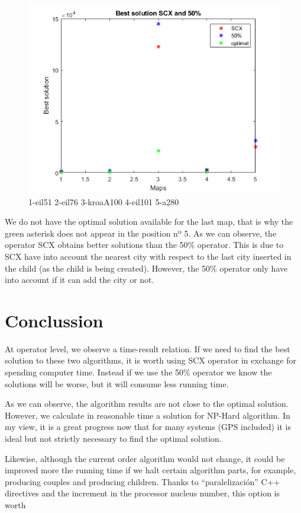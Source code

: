 \documentclass{article}
\begin{document}
\begin{figure}[H]
    \centering
    \includegraphics[width=1\textwidth]{solutions.png}
    \caption{1-eil51 2-eil76 3-kroaA100 4-eil101 5-a280}
\end{figure}
We do not have the optimal solution available for the last map, that is why the green asterisk does not appear in the position nº 5. 
As we can observe, the operator SCX obtains better solutions than the 50\% operator. This is due to SCX have into account the 
nearest city with respect to the last city inserted in the child (as the child is being created). However, the 50\% operator only have 
into account if it can add the city or not.

\section{Conclussion}
At operator level, we observe a time-result relation. If we need to find the best solution to these two algorithms, it is worth using SCX 
operator in exchange for spending computer time. Instead if we use the 50\% operator we know the solutions will be worse, but it will consume 
less running time. 

As we can observe, the algorithm results are not close to the optimal solution. However, we calculate in reasonable time a solution for NP-Hard 
algorithm. In my view, it is a great progress now that for many systems (GPS included) it is ideal but not strictly necessary to find the 
optimal solution.


Likewise, although the current order algorithm would not change, it could be improved more the running time if we halt certain algorithm parts, 
for example, producing couples and producing children. Thanks to “paralelización” C++ directives and the increment in the processor nucleus number, 
this option is worth 
\end{document}
